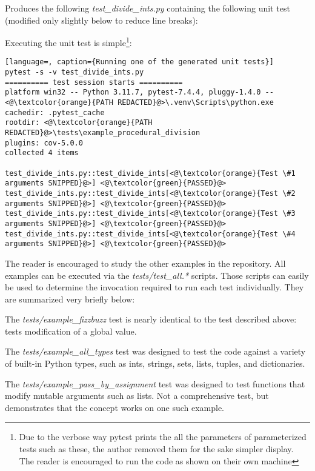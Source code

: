 Produces the following \textit{test\_divide\_ints.py} containing the following 
unit test (modified only slightly below to reduce line breaks):



Executing the unit test is simple\footnote{Due to the verbose way pytest prints the 
all the parameters of  parameterized tests such as these, the author removed
them for the sake simpler display.  The reader is encouraged to run the code 
as shown on their own machine}:

\begin{lstlisting}[language=, caption={Running one of the generated unit tests}]
pytest -s -v test_divide_ints.py
========== test session starts ==========
platform win32 -- Python 3.11.7, pytest-7.4.4, pluggy-1.4.0 -- <@\textcolor{orange}{PATH REDACTED}@>\.venv\Scripts\python.exe
cachedir: .pytest_cache
rootdir: <@\textcolor{orange}{PATH REDACTED}@>\tests\example_procedural_division
plugins: cov-5.0.0
collected 4 items

test_divide_ints.py::test_divide_ints[<@\textcolor{orange}{Test \#1 arguments SNIPPED}@>] <@\textcolor{green}{PASSED}@>
test_divide_ints.py::test_divide_ints[<@\textcolor{orange}{Test \#2 arguments SNIPPED}@>] <@\textcolor{green}{PASSED}@>
test_divide_ints.py::test_divide_ints[<@\textcolor{orange}{Test \#3 arguments SNIPPED}@>] <@\textcolor{green}{PASSED}@>
test_divide_ints.py::test_divide_ints[<@\textcolor{orange}{Test \#4 arguments SNIPPED}@>] <@\textcolor{green}{PASSED}@>
\end{lstlisting}

The reader is encouraged to study the other examples in the repository.
All examples can be executed via the 
\textit{tests/test\_all.*} scripts.  Those
scripts can easily be used to determine the invocation required to run each 
test individually.  They are summarized very briefly below:

The \textit{tests/example\_fizzbuzz} test is nearly identical to the 
test described above: tests modification of a global value.

The \textit{tests/example\_all\_types} test was designed to test
the code against a variety of built-in Python types, 
such as ints, strings, sets, lists, tuples, and dictionaries.

The \textit{tests/example\_pass\_by\_assignment} test was designed to test
functions that modify mutable arguments such as lists. Not a comprehensive test,
but demonstrates that the concept works on one such example.

